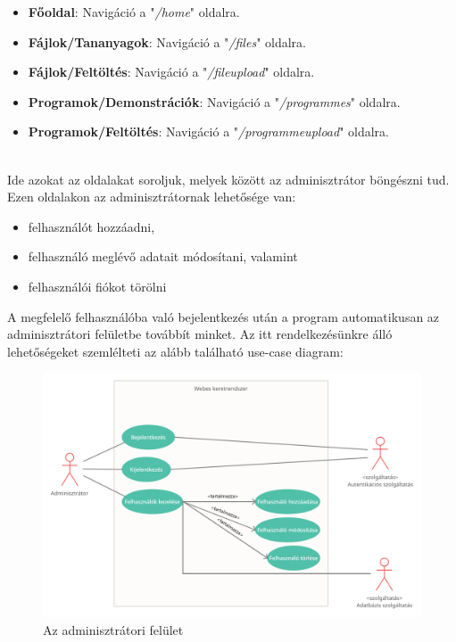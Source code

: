 \begin{itemize}
\item{\textbf{Főoldal}: Navigáció a "\textit{/home}" oldalra.}
\item{\textbf{Fájlok/Tananyagok}: Navigáció a "\textit{/files}" oldalra.}
\item{\textbf{Fájlok/Feltöltés}: Navigáció a "\textit{/fileupload}" oldalra.}
\item{\textbf{Programok/Demonstrációk}: Navigáció a "\textit{/programmes}" oldalra.}
\item{\textbf{Programok/Feltöltés}: Navigáció a "\textit{/programmeupload}" oldalra.}
\end{itemize}

\\

Ide azokat az oldalakat soroljuk, melyek között az adminisztrátor böngészni tud. Ezen oldalakon az adminisztrátornak lehetősége van:

\begin{itemize}
\item{felhasználót hozzáadni,}
\item{felhasználó meglévő adatait módosítani, valamint}
\item{felhasználói fiókot törölni}
\end{itemize}

A megfelelő felhasználóba való bejelentkezés után a program automatikusan az adminisztrátori felületbe továbbít minket. Az itt rendelkezésünkre álló lehetőségeket szemlélteti az alább található use-case diagram:

\begin{figure}[h]
	\centering
		\includegraphics[width=15truecm, height=10truecm]{images/adminisztrator_use_case.png}
	\caption{Az adminisztrátori felület}
	\label{fig:adminusecase}
\end{figure}

